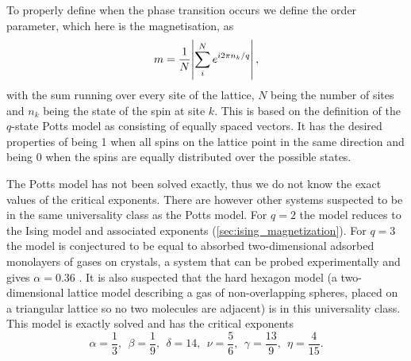 \documentclass[11pt, a4paper]{report} %
\begin{document}
To properly define when the phase transition occurs we define the order parameter, which here is the magnetisation, as
\begin{equation}
	m = \frac{1}{N}\abs{\sum_i^N e^{i2\pi n_k / q}},
\end{equation}
with the sum running over every site of the lattice, \(N\) being the number of sites and \(n_k\) being the state of the spin at site \(k\).
This is based on the definition of the \(q\)-state Potts model as consisting of equally spaced vectors.
It has the desired properties of being 1 when all spins on the lattice point in the same direction and being 0 when the spins are equally distributed over the possible states.

The Potts model has not been solved exactly, thus we do not know the exact values of the critical exponents.
There are however other systems suspected to be in the same universality class as the Potts model.
For \(q=2\) the model reduces to the Ising model and associated exponents (\cref{sec:ising_magnetization}).
For \(q=3\) the model is conjectured to be equal to absorbed two-dimensional adsorbed monolayers of gases on crystals, a system that can be probed experimentally and gives \(\alpha = 0.36\) \cite{binder:1981a}.
It is also suspected that the hard hexagon model (a two-dimensional lattice model describing a gas of non-overlapping spheres, placed on a triangular lattice so no two molecules are adjacent) is in this universality class.
This model is exactly solved and has the critical exponents \cite{baxter:1989,wu:1982}
\begin{equation}\label{eq:potts_critical_exponents}
	\alpha = \frac{1}{3},\ \ \beta = \frac{1}{9},\ \ \delta = 14,\ \ \nu = \frac{5}{6},\ \ \gamma = \frac{13}{9},\ \ \eta = \frac{4}{15}.
\end{equation}
\end{document}
